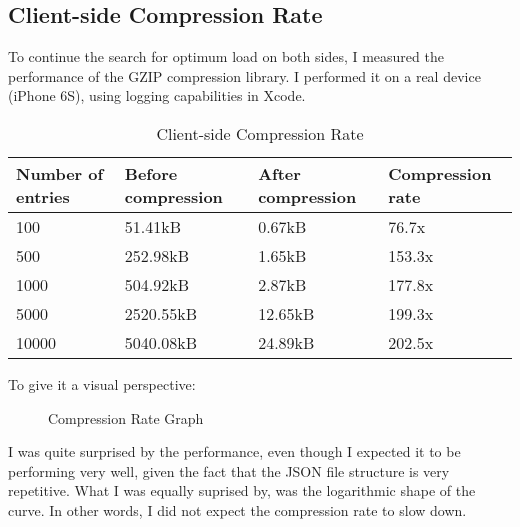 \newpage

\subsection{Client-side Compression Rate}

To continue the search for optimum load on both sides, I measured the performance of the GZIP compression library. I performed it on a real device (iPhone 6S), using logging capabilities in Xcode. 

\begin{table}[!ht]
\begin{center}
\begin{tabular}{|l|l|l|l|}
\hline
\textbf{Number of entries} & \textbf{Before compression} & \textbf{After compression} & \textbf{Compression rate} \\
\hline
100 & 51.41kB & 0.67kB & 76.7x \\
\hline
500 & 252.98kB & 1.65kB & 153.3x \\
\hline
1000 & 504.92kB & 2.87kB & 177.8x \\
\hline
5000 & 2520.55kB & 12.65kB & 199.3x \\
\hline
10000 & 5040.08kB & 24.89kB & 202.5x \\
\hline
\end{tabular}
\end{center}
\caption{Client-side Compression Rate}
\label{tab:ex_db}
\end{table}

To give it a visual perspective:

\begin{figure}[!ht]
\begin{center}
\end{center}
\caption{Compression Rate Graph}
\end{figure}

I was quite surprised by the performance, even though I expected it to be performing very well, given the fact that the JSON file structure is very repetitive. What I was equally suprised by, was the logarithmic shape of the curve. In other words, I did not expect the compression rate to slow down.

